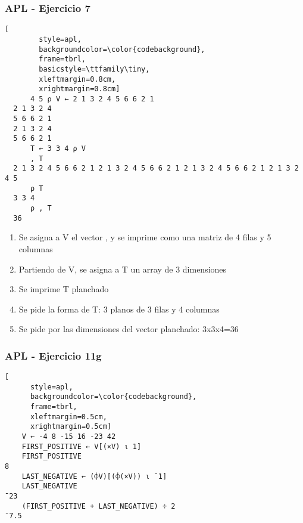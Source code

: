 \documentclass{beamer}
\let\OldTexttt\texttt
\renewcommand{\texttt}[1]{\OldTexttt{\color{magenta}{#1}}}
\begin{document}
\begin{frame}[fragile]
  \frametitle{APL - Ejercicio 7}

  \begin{center}
      \begin{lstlisting}[
        style=apl,
        backgroundcolor=\color{codebackground},
        frame=tbrl,
        basicstyle=\ttfamily\tiny,
        xleftmargin=0.8cm,
        xrightmargin=0.8cm]
      4 5 ⍴ V ← 2 1 3 2 4 5 6 6 2 1
  2 1 3 2 4
  5 6 6 2 1
  2 1 3 2 4
  5 6 6 2 1
      T ← 3 3 4 ⍴ V
      , T
  2 1 3 2 4 5 6 6 2 1 2 1 3 2 4 5 6 6 2 1 2 1 3 2 4 5 6 6 2 1 2 1 3 2 4 5
      ⍴ T
  3 3 4
      ⍴ , T
  36
      \end{lstlisting}
  \end{center}

  \begin{enumerate}
    \item Se asigna a V el vector \texttt{2 1 3 2 4 5 6 6 2 1}, y se imprime como una matriz de 4 filas y 5 columnas
    \item Partiendo de V, se asigna a T un array de 3 dimensiones
    \item Se imprime T planchado
    \item Se pide la forma de T: 3 planos de 3 filas y 4 columnas
    \item Se pide por las dimensiones del vector planchado: 3x3x4=36
  \end{enumerate}

\end{frame}

\begin{frame}[fragile]
  \frametitle{APL - Ejercicio 11g}

  \begin{center}


    \begin{lstlisting}[
      style=apl,
      backgroundcolor=\color{codebackground},
      frame=tbrl,
      xleftmargin=0.5cm,
      xrightmargin=0.5cm]
    V ← -4 8 -15 16 -23 42
    FIRST_POSITIVE ← V[(×V) ⍳ 1]
    FIRST_POSITIVE
8
    LAST_NEGATIVE ← (⌽V)[(⌽(×V)) ⍳ ¯1]
    LAST_NEGATIVE
¯23
    (FIRST_POSITIVE + LAST_NEGATIVE) ÷ 2
¯7.5
    \end{lstlisting}
  \end{center}
\end{frame}
\end{document}
